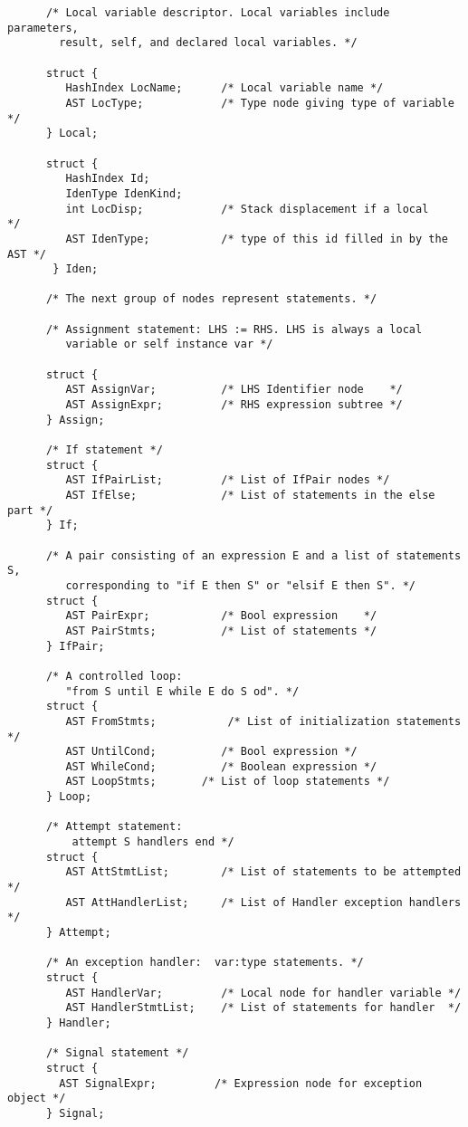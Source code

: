 {\begin{verbatim}
      /* Local variable descriptor. Local variables include parameters,
        result, self, and declared local variables. */

      struct {
         HashIndex LocName;      /* Local variable name */
         AST LocType;            /* Type node giving type of variable */
      } Local;

      struct {
         HashIndex Id;
         IdenType IdenKind;
         int LocDisp;            /* Stack displacement if a local        */
         AST IdenType;           /* type of this id filled in by the AST */
       } Iden;

      /* The next group of nodes represent statements. */

      /* Assignment statement: LHS := RHS. LHS is always a local
         variable or self instance var */

      struct {
         AST AssignVar;          /* LHS Identifier node    */
         AST AssignExpr;         /* RHS expression subtree */
      } Assign;

      /* If statement */
      struct {
         AST IfPairList;         /* List of IfPair nodes */
         AST IfElse;             /* List of statements in the else part */
      } If;   

      /* A pair consisting of an expression E and a list of statements S,
         corresponding to "if E then S" or "elsif E then S". */
      struct {
         AST PairExpr;           /* Bool expression    */
         AST PairStmts;          /* List of statements */
      } IfPair;

      /* A controlled loop:
         "from S until E while E do S od". */
      struct {
         AST FromStmts;           /* List of initialization statements */
         AST UntilCond;          /* Bool expression */
         AST WhileCond;          /* Boolean expression */
         AST LoopStmts;       /* List of loop statements */
      } Loop;

      /* Attempt statement:
          attempt S handlers end */
      struct {
         AST AttStmtList;        /* List of statements to be attempted */
         AST AttHandlerList;     /* List of Handler exception handlers */
      } Attempt;

      /* An exception handler:  var:type statements. */
      struct {
         AST HandlerVar;         /* Local node for handler variable */
         AST HandlerStmtList;    /* List of statements for handler  */
      } Handler;

      /* Signal statement */
      struct {
        AST SignalExpr;         /* Expression node for exception object */
      } Signal;


\end{verbatim}}
